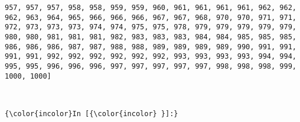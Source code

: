 \documentclass[11pt]{article}
\begin{document}
\begin{Verbatim}[commandchars=\\\{\}]
957, 957, 957, 958, 958, 959, 959, 960, 961, 961, 961, 961, 962, 962, 962, 963, 964, 965, 966, 966, 966, 967, 967, 968, 970, 970, 971, 971, 972, 973, 973, 973, 974, 974, 975, 975, 978, 979, 979, 979, 979, 979, 980, 980, 981, 981, 981, 982, 983, 983, 983, 984, 984, 985, 985, 985, 986, 986, 986, 987, 987, 988, 988, 989, 989, 989, 989, 990, 991, 991, 991, 991, 992, 992, 992, 992, 992, 992, 993, 993, 993, 993, 994, 994, 995, 995, 996, 996, 996, 997, 997, 997, 997, 997, 998, 998, 998, 999, 1000, 1000]

    \end{Verbatim}

    \begin{center}
    \end{center}
    { \hspace*{\fill} \\}
    
    \begin{Verbatim}[commandchars=\\\{\}]
{\color{incolor}In [{\color{incolor} }]:} 
\end{Verbatim}


    
    
    
    
\end{document}
